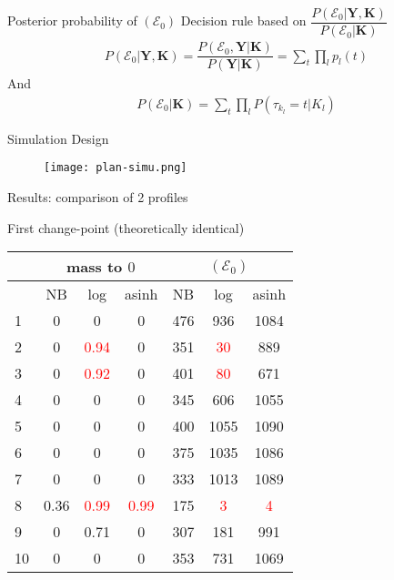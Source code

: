 \documentclass[a4paper]{beamer}
\begin{document}
\begin{frame}{Posterior probability of $(\mathcal{E}_0)$}
  Decision rule based on $\dfrac{P(\mathcal{E}_0|\mathbf{Y},\mathbf{K})}{P(\mathcal{E}_0|\mathbf{K})} $
  \begin{eqnarray*}
		P(\mathcal{E}_0|\mathbf{Y},\mathbf{K})=\dfrac{P(\mathcal{E}_0,\mathbf{Y}|\mathbf{K})}{P(\mathbf{Y}|\mathbf{K})} = \sum_{t} \prod_{l} p_l(t)
	\end{eqnarray*} 
	And
	\begin{eqnarray*}
		P(\mathcal{E}_0|\mathbf{K}) = \sum_{t} \prod_{l} P(\tau_{k_l}=t|K_l)
	\end{eqnarray*} 
\end{frame}

\begin{frame}{Simulation Design}
 \begin{figure}
  \texttt{[image: plan-simu.png]}
 \end{figure}
\end{frame}

\begin{frame}{Results: comparison of 2 profiles}
 \begin{center}
First change-point (theoretically identical)
\begin{table}[h]
\begin{tabular}{l|ccc||ccc}
 & \multicolumn{3}{c||}{mass to $0$} & \multicolumn{3}{c}{$(\mathcal{E}_0)$} \\
  \hline
  &  NB &  log &  asinh & NB & log & asinh\\ 
  \hline
1 & 0 & 0 & 0 & 476 & 936 & 1084\\
2 & 0 & \textcolor{red}{0.94} & 0 & 351 & \textcolor{red}{30} & 889\\
3 & 0 & \textcolor{red}{0.92} & 0 & 401 & \textcolor{red}{80} & 671\\
4 & 0 & 0 & 0 & 345 & 606& 1055\\
5 & 0 & 0 & 0 & 400 & 1055 & 1090\\
6 & 0 & 0 & 0 & 375 & 1035 & 1086\\
7 & 0 & 0 & 0 & 333 & 1013 & 1089\\ 
8 & 0.36 & \textcolor{red}{0.99} & \textcolor{red}{0.99} & 175 & \textcolor{red}{3} & \textcolor{red}{4}\\
9 & 0 & 0.71 & 0 & 307 & 181 & 991\\
10 & 0 & 0 & 0 & 353 & 731 & 1069 \\
   \hline
\end{tabular}
\end{table}
\end{center}
\end{frame}
\end{document}
